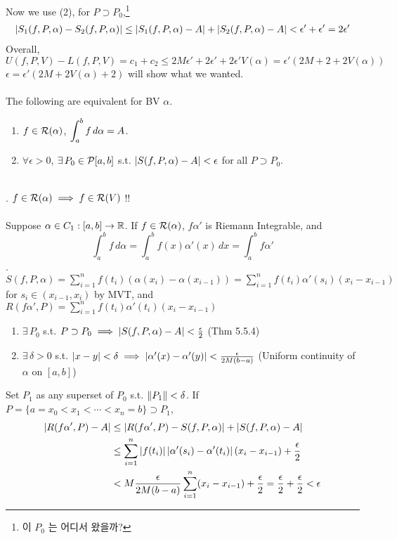 Now we use (2), for $P\supset P_0$,\footnote{이 $P_0$ 는 어디서 왔을까?}
$$\begin{aligned}
\left|S_1(f, P, \alpha) - S_2(f, P, \alpha)\right| \leq \left|S_1(f, P, \alpha) - A\right| + \left|S_2(f, P, \alpha) - A\right| < \epsilon' + \epsilon' = 2\epsilon'
\end{aligned}$$
Overall, $$U(f, P, V)-L(f, P, V) = c_1+c_2 \leq 2M\epsilon' + 2\epsilon' + 2\epsilon'V(\alpha) = \epsilon'(2M+2+2V(\alpha))$$
$\epsilon = \epsilon'(2M+2V(\alpha) + 2)$ will show what we wanted.\\
\\
 The following are equivalent for BV $\alpha$.
\begin{enumerate}
	\item $f\in \mathcal{R}(\alpha)$, $\displaystyle \int_a^b f\,d\alpha = A$.
	\item $\forall \epsilon > 0$, $\exists \, P_0\in \mathcal{P}[a, b]$ s.t. $\left|S(f, P, \alpha) - A\right| < \epsilon$ for all $P \supset P_0$.
\end{enumerate}~\\
\rmk. $f\in \mathcal{R}(\alpha) \implies f\in \mathcal{R}(V)$ !!\\
\\
 Suppose $\alpha \in C_1 : [a, b]\rightarrow\mathbb{R}$. If $f \in \mathcal{R}(\alpha)$,
$f\alpha'$ is Riemann Integrable, and
$$\int_a^b f \,d\alpha = \int_a^b f(x)\alpha'(x)\,dx = \int_a^b f \alpha'$$
\pf. $S(f, P, \alpha) = \sum_{i=1}^n f(t_i)(\alpha(x_i) - \alpha(x_{i-1})) = \sum_{i=1}^n f(t_i)\alpha'(s_i)(x_i-x_{i-1})$ for $s_i\in(x_{i-1}, x_i)$ by MVT, and 
$R(f\alpha', P) = \sum_{i=1}^n f(t_i)\alpha'(t_i)(x_{i}-x_{i-1})$
\begin{enumerate}
	\item $\exists\,P_0$ s.t. $P\supset P_0 \implies \left|S(f, P, \alpha) -A\right| < \frac{\epsilon}{2}$ (Thm 5.5.4)
	\item $\exists\,\delta > 0$ s.t. $\left|x-y\right| < \delta \implies \left|\alpha'(x) - \alpha'(y)\right| < \frac{\epsilon}{2M(b-a)}$ (Uniform continuity of $\alpha$ on $[a, b]$)
\end{enumerate}
Set $P_1$ as any superset of $P_0$ s.t. $\left\lVert P_1\right\rVert < \delta$. If $P = \{a =x_0<x_1<\cdots <x_n=b \} \supset P_1$,
$$\begin{aligned}
\left|R(f\alpha', P) - A\right| &\leq \left|R(f\alpha', P)-S(f, P, \alpha)\right| + \left|S(f, P, \alpha) - A\right| \\ 
&\leq \sum_{i=1}^n \left|f(t_i)\right| \left|\alpha'(s_i) - \alpha'(t_i)\right| (x_i-x_{i-1}) + \frac{\epsilon}{2}\\
&< M\frac{\epsilon}{2M(b-a)} \sum_{i=1}^n (x_i-x_{i-1}) + \frac{\epsilon}{2} = \frac{\epsilon}{2} + \frac{\epsilon}{2} < \epsilon
\end{aligned}$$
